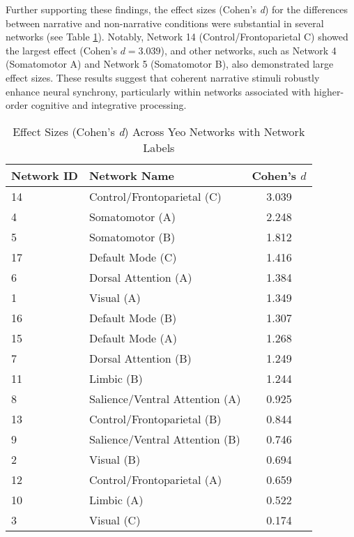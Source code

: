\documentclass[stu,12pt,floatsintext]{apa7}
\begin{document}
Further supporting these findings, the effect sizes (Cohen's \emph{d}) for the differences between narrative and non-narrative conditions were substantial in several networks (see Table \ref{tab:effectSize}). Notably, Network 14 (Control/Frontoparietal C) showed the largest effect (Cohen's $d = 3.039$), and other networks, such as Network 4 (Somatomotor A) and Network 5 (Somatomotor B), also demonstrated large effect sizes. These results suggest that coherent narrative stimuli robustly enhance neural synchrony, particularly within networks associated with higher-order cognitive and integrative processing.

\begin{table}[ht!]
\centering
\caption{Effect Sizes (Cohen's \emph{d}) Across Yeo Networks with Network Labels}
\label{tab:effectSize}
\begin{tabular}{llc}
\hline
\textbf{Network ID} & \textbf{Network Name} & \textbf{Cohen's $d$} \\
\hline
14 & Control/Frontoparietal (C)          & 3.039 \\
4  & Somatomotor (A)                     & 2.248 \\
5  & Somatomotor (B)                     & 1.812 \\
17 & Default Mode (C)                    & 1.416 \\
6  & Dorsal Attention (A)                & 1.384 \\
1  & Visual (A)                          & 1.349 \\
16 & Default Mode (B)                    & 1.307 \\
15 & Default Mode (A)                    & 1.268 \\
7  & Dorsal Attention (B)                & 1.249 \\
11 & Limbic (B)                          & 1.244 \\
8  & Salience/Ventral Attention (A)      & 0.925 \\
13 & Control/Frontoparietal (B)          & 0.844 \\
9  & Salience/Ventral Attention (B)      & 0.746 \\
2  & Visual (B)                          & 0.694 \\
12 & Control/Frontoparietal (A)          & 0.659 \\
10 & Limbic (A)                          & 0.522 \\
3  & Visual (C)                          & 0.174 \\
\hline
\end{tabular}
\end{table}
\end{document}
